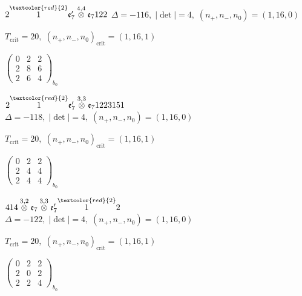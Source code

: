 \documentclass[10pt]{article}
\begin{document}
\smallskip

$2\overset{\textcolor{red}{2}}{1}\mathfrak{e}_7'\overset{4,4}{\otimes}\mathfrak{e}_7122$ \quad $\Delta=-116,\; |\det|=4,\; (n_+,n_-,n_0)=(1,16,0)$

\hspace{1em}$T_{\text{crit}}=20,\; (n_+,n_-,n_0)_{\text{crit}}=(1,16,1)$

\hspace{2em}$\left(\begin{smallmatrix}0 & 2 & 2 \\ 2 & 8 & 6 \\ 2 & 6 & 4\end{smallmatrix}\right)_{\!b_0}$

\smallskip

$2\overset{\textcolor{red}{2}}{1}\mathfrak{e}_7'\overset{3,3}{\otimes}\mathfrak{e}_71223151$ \quad $\Delta=-118,\; |\det|=4,\; (n_+,n_-,n_0)=(1,16,0)$

\hspace{1em}$T_{\text{crit}}=20,\; (n_+,n_-,n_0)_{\text{crit}}=(1,16,1)$

\hspace{2em}$\left(\begin{smallmatrix}0 & 2 & 2 \\ 2 & 4 & 4 \\ 2 & 4 & 4\end{smallmatrix}\right)_{\!b_0}$

\smallskip

$414\overset{3,2}{\otimes}\mathfrak{e}_7\overset{3,3}{\otimes}\mathfrak{e}_7'\overset{\textcolor{red}{2}}{1}2$ \quad $\Delta=-122,\; |\det|=4,\; (n_+,n_-,n_0)=(1,16,0)$

\hspace{1em}$T_{\text{crit}}=20,\; (n_+,n_-,n_0)_{\text{crit}}=(1,16,1)$

\hspace{2em}$\left(\begin{smallmatrix}0 & 2 & 2 \\ 2 & 0 & 2 \\ 2 & 2 & 4\end{smallmatrix}\right)_{\!b_0}$

\smallskip
\end{document}
